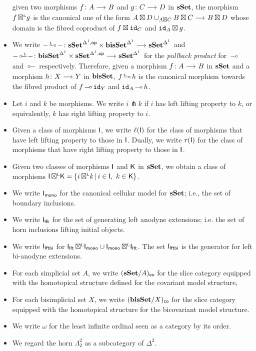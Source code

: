 \documentclass[a4paper,  dvipsnames, 11pt]{amsart}
\begin{document}
\begin{notation}
\begin{itemize}
			given two morphisms $f\colon A\arr B$ and $g\colon C\arr D$ in $\mathbf{sSet}$, the morphism $f{\mathrel{\,\boxtimes^{\text{\tiny{L}}}}} g$ is the canonical one of the form
			$A\boxtimes D \cup_{A\boxtimes C} B\boxtimes C\arr B\boxtimes D$ whose domain is the fibred coproduct of $f\boxtimes \mathtt{id}_{C}$ and $\mathtt{id}_{A}\boxtimes g$.
		\item %
			We write
			$-\rollipopL-\colon\sSet^{\ra,\op}\times\bisSet^\ra\arr\sSet^\ra$
			and
			$-\lollipopL-\colon\bisSet^\ra\times\sSet^{\ra,\op}\arr\sSet^\ra$
			for the \textit{pullback product} for $\rollipop$ and $\lollipop$ respectively.
			Therefore, given a morphism $f\colon A \arr B$ in $\mathbf{sSet}$ and a morphism $h\colon X\arr Y$ in $\mathbf{bisSet}$,
			$f\rollipopL h$ is the canonical morphism towards the fibred product of $f\rollipop \id_Y$ and $\id_A\rollipop h$.
		\item %
			Let $i$ and $k$ be morphisms.
			We write $i\pitchfork k$ if $i$ has left lifting property to $k$, or equivalently,
			$k$ has right lifting property to $i$.
		\item
			Given a class of morphisms $\mathsf{I}$,
			we write $\ell(\mathsf{I})$ for the class of morphisms that have left lifting property to those in $\mathsf{I}$.
			Dually, we write $r(\mathsf{I})$ for the class of morphisms that have right lifting property to those in $\mathsf{I}$.
		\item %
			Given two classes of morphisms $\mathsf{I}$ and $\mathsf{K}$ in $\mathbf{sSet}$,
			we obtain a class of morphisms $\mathsf{I}{\mathrel{\,\boxtimes^{\text{\tiny{L}}}}}\mathsf{K}=\{ i{\mathrel{\,\boxtimes^{\text{\tiny{L}}}}} k\,|\,i\in\mathsf{I},\ k\in\mathsf{K} \}$.
		\item %
			We write $\mathsf{I}_{\mathsf{mono}}$ for the canonical cellular model for $\mathbf{sSet}$; i.e., the set of boundary inclusions.
		\item %
			We write $\mathsf{I}_{\mathsf{lft}}$ for the set of generating left anodyne extensions; i.e. the set of horn inclusions lifting initial objects.
		\item %
			We write $\mathsf{I}_{\mathsf{lftbi}}$ for $\mathsf{I}_{\mathsf{lft}}{\mathrel{\,\boxtimes^{\text{\tiny{L}}}}}\mathsf{I}_{\mathsf{mono}}\cup\mathsf{I}_{\mathsf{mono}}{\mathrel{\,\boxtimes^{\text{\tiny{L}}}}}\mathsf{I}_{\mathsf{lft}}$.
			The set
			$\mathsf{I}_{\mathsf{lftbi}}$ is the generator for left bi-anodyne extensions.
		\item %
			For each simplicial set $A$,
			we write $(\mathbf{sSet}/A)_{\mathsf{co}}$ for the slice category equipped with the homotopical structure defined for the covariant model structure,
		\item %
			For each bisimplicial set $X$,
			we write $(\mathbf{bisSet}/X)_{\mathsf{co}}$ for the slice category equipped with the homotopical structure for the bicovariant model structure.
		\item %
			We write $\omega$ for the least infinite ordinal seen as a category by its order.
		\item %
			We regard the horn $\Lambda^2_2$ as a subcategory of $\Delta^2$.
		\qedhere %
	\end{itemize}
\end{notation}
\end{document}
